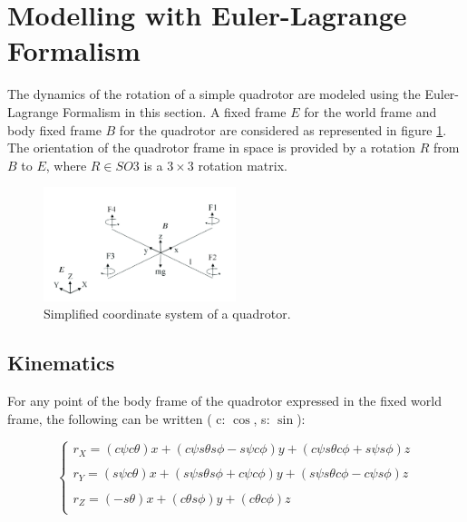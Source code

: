 \documentclass{thesisreport}
\begin{document}
\newpage 

 \section{Modelling with Euler-Lagrange Formalism} 
 The dynamics of the rotation of a simple quadrotor are modeled using the Euler-Lagrange Formalism in this section. A fixed frame $E$ for the world frame and body fixed frame $B$ for the quadrotor are considered as represented in figure \ref{coordinate_system_simple}. The orientation of the quadrotor frame in space is provided by a rotation $R$ from $B$ to $E$, where $R\in SO3$ is a $3 \times 3 $ rotation matrix.
 
 
 \begin{figure}[h]
 \centering
 \includegraphics[width=0.5\textwidth]{Images/Modeling/Test_Bench}
 \caption{Simplified coordinate system of a quadrotor. \cite{Bouabdalla2007}}
 \label{coordinate_system_simple}
 \end{figure}

\subsection{Kinematics} 
 
 For any point of the body frame of the quadrotor expressed in the fixed world frame, the following can be written 
 ( c: $\cos$, s: $\sin$):   
 
 \begin{equation}\label{kinematics}
 \begin{cases}
 r_X= (c\psi c \theta ) x + ( c \psi s \theta s \phi  - s \psi c \phi) y + (c \psi s \theta c \phi + s \psi s \phi) z \\
 \\
 r_Y= (s\psi c \theta ) x + ( s \psi s \theta s \phi  + c \psi c \phi) y + (s \psi s \theta c \phi - c \psi s \phi) z \\
 \\
 r_Z= (-s \theta ) x + ( c \theta s \phi ) y + (c \theta c \phi) z \\ 
 \end{cases}
 \end{equation}
\end{document}
